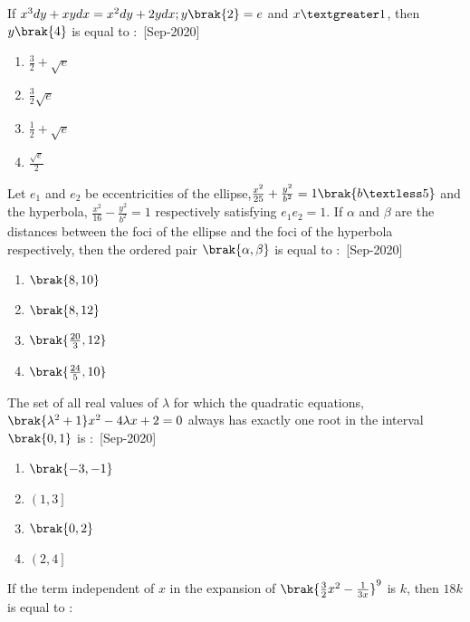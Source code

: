 \iffalse
\title{2020}
\author{EE24BTECH11021}
\section{mcq-single}
\fi
    \item If $x^3dy+xy dx=x^2dy+2y dx;y\brak{2}=e$ and $x\textgreater 1$, then $y\brak{4}$ is equal to $\colon$
    \hfill{[Sep-2020]}
        \begin{enumerate}
            \item $\frac{3}{2}+\sqrt{e}$
            \item $\frac{3}{2}\sqrt{e}$
            \item $\frac{1}{2}+\sqrt{e}$
            \item $\frac{\sqrt{e}}{2}$
        \end{enumerate}
    \item Let $e_1$ and $e_2$ be eccentricities of the ellipse,$\frac{x^2}{25}+\frac{y^2}{b^2}=1\brak{b\textless 5}$ and the hyperbola, $\frac{x^2}{16}-\frac{y^2}{b^2}=1$ respectively satisfying $e_1e_2=1$. If $\alpha$ and $\beta$ are the distances between the foci of the ellipse and the foci of the hyperbola respectively, then the ordered pair $\brak{\alpha,\beta}$ is equal to $\colon$
    \hfill{[Sep-2020]}
        \begin{enumerate}
            \item $\brak{8,10}$
            \item $\brak{8,12}$
            \item $\brak{\frac{20}{3},12}$
            \item $\brak{\frac{24}{5},10}$
        \end{enumerate}
    \item The set of all real values of $\lambda$ for which the quadratic equations,\\ $\brak{\lambda^2+1}x^2-4\lambda x+2=0$ always has exactly one root in the interval $\brak{0,1}$ is $\colon$
    \hfill{[Sep-2020]}
        \begin{enumerate}
            \item $\brak{-3,-1}$
            \item $\left(1,3 \right]$
            \item $\brak{0,2}$
            \item $\left(2,4 \right]$
        \end{enumerate}
    \item If the term independent of $x$ in the expansion of $\brak{\frac{3}{2}x^2-\frac{1}{3x}}^9$ is $k$, then $18k$ is equal to $\colon$
